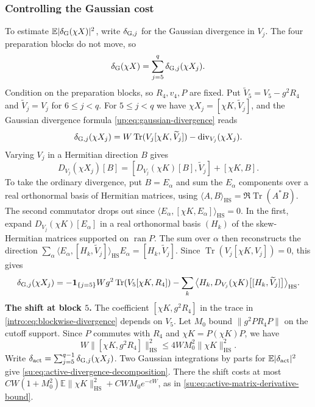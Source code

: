 \documentclass[11pt]{article}
\numberwithin{equation}{section}
\theoremstyle{remark}
\newcommand{\E}{\mathbb E}
\newcommand{\Tr}{\operatorname{Tr}}
\newcommand{\ran}{\operatorname{ran}}
\newcommand{\HS}{\mathrm{HS}}
\begin{document}
\subsubsection{Controlling the Gaussian cost}
\label{sec:intro-small-gaussian-cost}

To estimate $\E|\delta_{\rm G}(\chi X)|^2$, write $\delta_{{\rm G},j}$
for the Gaussian divergence in $V_j$. The four preparation blocks do
not move, so
\[
 \delta_{\rm G}(\chi X)
 =\sum_{j=5}^{q}\delta_{{\rm G},j}(\chi X_j).
\]
Condition on the preparation blocks, so $R_4,v_4,P$ are fixed.
Put $\widetilde V_5=V_5-g^2R_4$ and $\widetilde V_j=V_j$ for
$6\le j<q$. For $5\le j<q$ we have $\chi X_j=[\chi K,\widetilde V_j]$,
and the Gaussian divergence formula \eqref{up:eq:gaussian-divergence} reads
\[
 \delta_{{\rm G},j}(\chi X_j)
 = W\Tr(V_j[\chi K,\widetilde V_j])
   -\operatorname{div}_{V_j}(\chi X_j).
\]
Varying $V_j$ in a Hermitian direction $B$ gives
\[
  D_{V_j}(\chi X_j)[B]
   =[D_{V_j}(\chi K)[B],\widetilde V_j]+[\chi K,B].
\]
To take the ordinary divergence, put $B=E_\alpha$ and sum the
$E_\alpha$ components over a real orthonormal basis of Hermitian
matrices, using $\langle A,B\rangle_{\HS}=\Re\Tr(A^*B)$.
The second commutator drops out since
$\langle E_\alpha,[\chi K,E_\alpha]\rangle_{\HS}=0$.
In the first, expand $D_{V_j}(\chi K)[E_\alpha]$ in a real orthonormal
basis $(H_k)$ of the skew-Hermitian matrices supported on $\ran P$.
The sum over $\alpha$ then reconstructs the direction
$\sum_\alpha\langle E_\alpha,[H_k,\widetilde V_j]\rangle_{\HS}E_\alpha
 =[H_k,\widetilde V_j]$. Since $\Tr(V_j[\chi K,V_j])=0$, this gives
\begin{equation}\label{intro:eq:blockwise-divergence}
 \delta_{{\rm G},j}(\chi X_j)
 =-\mathbf1_{\{j=5\}}Wg^2\Tr(V_5[\chi K,R_4])
  -\sum_k\big\langle H_k,
      D_{V_j}(\chi K)\bigl[[H_k,\widetilde V_j]\bigr]\big\rangle_{\HS}.
\end{equation}
\textbf{The shift at block $5$.}
The coefficient $[\chi K,g^2R_4]$ in the trace in
\eqref{intro:eq:blockwise-divergence} depends on $V_5$.
Let $M_0$ bound $\|g^2PR_4P\|$ on the cutoff support. Since $P$
commutes with $R_4$ and $\chi K=P(\chi K)P$, we have
\[
 W\|[\chi K,g^2R_4]\|_{\HS}^2
 \le 4WM_0^2\|\chi K\|_{\HS}^2.
\]
Write $\delta_{\rm act}=\sum_{j=5}^{q-1}\delta_{{\rm G},j}(\chi X_j)$.
Two Gaussian integrations by parts for $\E|\delta_{\rm act}|^2$ give
\eqref{su:eq:active-divergence-decomposition}. There the shift costs at most
$CW(1+M_0^2)\E\|\chi K\|_{\HS}^2+CWM_0e^{-cW}$, as in
\eqref{su:eq:active-matrix-derivative-bound}.
\end{document}
